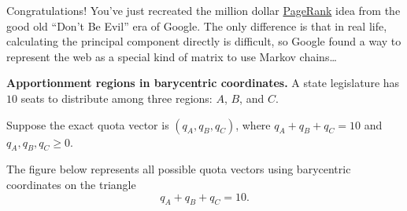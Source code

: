 \documentclass[12pt,addpoints]{exam}
\begin{document}
\begin{questions}
\vfill

Congratulations! You've just recreated the million dollar \href{https://people.hamilton.edu/cgibbons/files/GooglingIt.mp4}{PageRank} idea from the good old ``Don't Be Evil'' era of Google. The only difference is that in real life, calculating the principal component directly is difficult, so Google found a way to represent the web as a special kind of matrix to use Markov chains\dots

\clearpage

\question \textbf{Apportionment regions in barycentric coordinates.} A state legislature has \(10\) seats to distribute among three regions:
\(A\), \(B\), and \(C\).

Suppose the exact quota vector is
$(q_A,q_B,q_C)$, where $q_A+q_B+q_C=10$ and $q_A,q_B,q_C \ge 0$.

The figure below represents all possible quota vectors using barycentric coordinates on the triangle
\[
q_A+q_B+q_C=10.
\]

\begin{center}
\end{center}

\end{questions}
\end{document}
